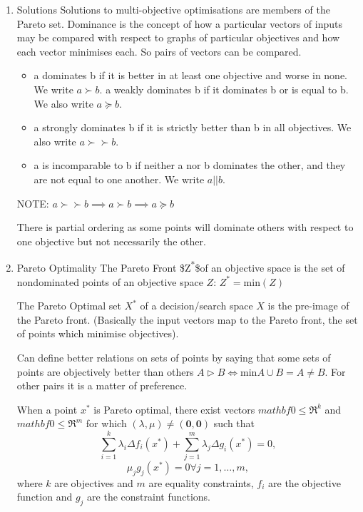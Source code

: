 \documentclass[11pt]{article}
\begin{document}
\begin{enumerate}
\item Solutions
\label{sec:org1f8019d}
Solutions to multi-objective optimisations are members of the Pareto
set.
Dominance is the concept of how a particular vectors of inputs may be
compared with respect to graphs of particular objectives and how each
vector minimises each. So pairs of vectors can be compared.

\begin{itemize}
\item a dominates b if it is better in at least one objective and worse in
none. We write \(a \succ b\).
a weakly dominates b if it dominates b or is equal to b. We also
write \(a \succeq b\).
\item a strongly dominates b if it is strictly better than b in all objectives. We also write
\(a \succ\succ  b\).
\item a is incomparable to b if neither a nor b dominates the other, and they are not equal
to one another. We write \(a || b\).
\end{itemize}
NOTE: \(a \succ\succ b \implies a \succ b \implies a \succeq b\)

There is partial ordering as some points will dominate others with
respect to one objective but not necessarily the other. 

\item Pareto Optimality
\label{sec:org70825e0}
The Pareto Front \$Z\textsuperscript{*}\$of an objective space is the set of nondominated
points of an objective space \(Z\): \(Z^{*} = \text{min}(Z)\)

The Pareto Optimal set \(X^*\) of a decision/search space \(X\) is the
pre-image of the Pareto front. (Basically the input vectors map to the
Pareto front, the set of points which minimise objectives).

Can define better relations on sets of points  by saying that some
sets of points are objectively better than others 
\(A \rhd B \Leftrightarrow \text{min} A \cup B = A \neq B\).
For other pairs it is a matter of preference.

When a point \(x^*\) is Pareto optimal, there exist vectors 
\(mathbf{0}\leq \mathfrak{R}^{k}\) and \(mathbf{0}\leq \mathfrak{R}^{m}\)
for which \((\lambda,\mu) \neq (\mathbf{0}, \mathbf{0})\) such that
\[ \sum_{i=1}^{k} \lambda_{i} \Delta f_{i}(x^*) + \sum_{j=1}^{m}
\lambda_{j} \Delta g_{i}(x^*) = 0, \]
\[ \mu_j g_j(x^*) = 0 \forall j = 1,\ldots,m, \]
where \(k\) are objectives and \(m\) are equality constraints, \(f_i\) are
the objective function and \(g_j\) are the constraint functions.






\end{enumerate}
\end{document}
